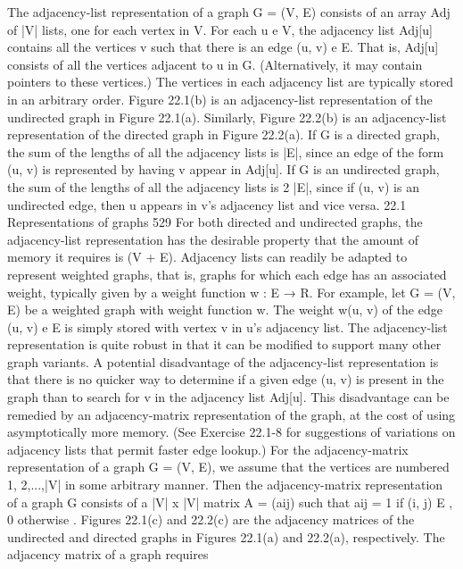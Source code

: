 The adjacency-list representation of a graph G = (V, E) consists of an array Adj of |V| lists, one for each vertex in V. For each u e V, the adjacency list Adj[u] contains all the vertices v such that there is an edge (u, v) e E. That is, Adj[u] consists of all the vertices adjacent to u in G. (Alternatively, it may contain pointers to these vertices.) The vertices in each adjacency list are typically stored in an arbitrary order. Figure 22.1(b) is an adjacency-list representation of the undirected graph in Figure 22.1(a). Similarly, Figure 22.2(b) is an adjacency-list representation of the directed graph in Figure 22.2(a). If G is a directed graph, the sum of the lengths of all the adjacency lists is |E|, since an edge of the form (u, v) is represented by having v appear in Adj[u]. If G is an undirected graph, the sum of the lengths of all the adjacency lists is 2 |E|, since if (u, v) is an undirected edge, then u appears in v’s adjacency list and vice versa. 22.1 Representations of graphs 529 For both directed and undirected graphs, the adjacency-list representation has the desirable property that the amount of memory it requires is 
(V + E). Adjacency lists can readily be adapted to represent weighted graphs, that is, graphs for which each edge has an associated weight, typically given by a weight function w : E → R. For example, let G = (V, E) be a weighted graph with weight function w. The weight w(u, v) of the edge (u, v) e E is simply stored with vertex v in u’s adjacency list. The adjacency-list representation is quite robust in that it can be modified to support many other graph variants. A potential disadvantage of the adjacency-list representation is that there is no quicker way to determine if a given edge (u, v) is present in the graph than to search for v in the adjacency list Adj[u]. This disadvantage can be remedied by an adjacency-matrix representation of the graph, at the cost of using asymptotically more memory. (See Exercise 22.1-8 for suggestions of variations on adjacency lists that permit faster edge lookup.) For the adjacency-matrix representation of a graph G = (V, E), we assume that the vertices are numbered 1, 2,...,|V| in some arbitrary manner. Then the adjacency-matrix representation of a graph G consists of a |V| x |V| matrix A = (aij) such that aij =  1 if (i, j)  E , 0 otherwise . Figures 22.1(c) and 22.2(c) are the adjacency matrices of the undirected and directed graphs in Figures 22.1(a) and 22.2(a), respectively. The adjacency matrix of a graph requires 
